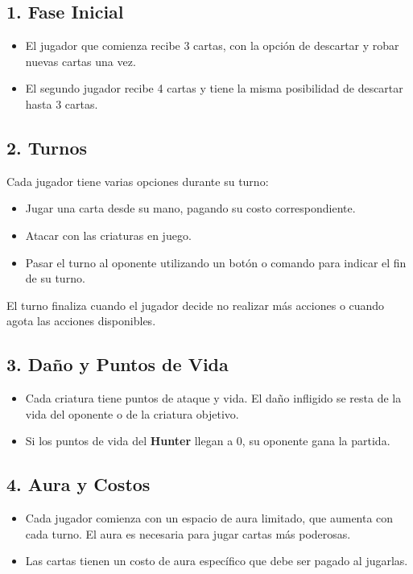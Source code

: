 \documentclass[12pt]{article}
\begin{document}
\subsection*{1. Fase Inicial}
\begin{itemize}
    \item El jugador que comienza recibe 3 cartas, con la opción de descartar y robar nuevas cartas una vez.
    \item El segundo jugador recibe 4 cartas y tiene la misma posibilidad de descartar hasta 3 cartas.
\end{itemize}

\subsection*{2. Turnos}
Cada jugador tiene varias opciones durante su turno:
\begin{itemize}
    \item Jugar una carta desde su mano, pagando su costo correspondiente.
    \item Atacar con las criaturas en juego.
    \item Pasar el turno al oponente utilizando un botón o comando para indicar el fin de su turno.
\end{itemize}
El turno finaliza cuando el jugador decide no realizar más acciones o cuando agota las acciones disponibles.

\subsection*{3. Daño y Puntos de Vida}
\begin{itemize}
    \item Cada criatura tiene puntos de ataque y vida. El daño infligido se resta de la vida del oponente o de la criatura objetivo.
    \item Si los puntos de vida del \textbf{Hunter} llegan a 0, su oponente gana la partida.
\end{itemize}

\subsection*{4. Aura y Costos}
\begin{itemize}
    \item Cada jugador comienza con un espacio de aura limitado, que aumenta con cada turno. El aura es necesaria para jugar cartas más poderosas.
    \item Las cartas tienen un costo de aura específico que debe ser pagado al jugarlas.
\end{itemize}
\end{document}
